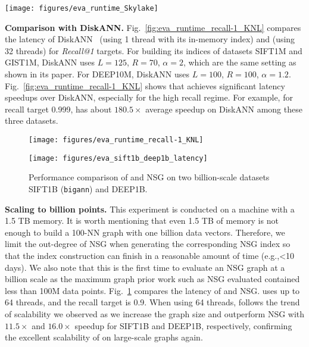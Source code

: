 \begin{figure*}
    \centering
    \texttt{[image: figures/eva\_runtime\_Skylake]}
    \caption[Study of Latency]{Latency comparison among HNSW, NSG, and \Hammer on  Skylake (16T).}
    \label{fig:eval-latency}
\end{figure*}

\textbf{Comparison with DiskANN.} Fig.~\ref{fig:eva_runtime_recall-1_KNL} compares the latency of DiskANN~\cite{subramanya32diskann} (using 1 thread with its in-memory index) and \Hammer (using 32 threads) for \emph{Recall@1} targets. 
For building its indices of datasets SIFT1M and GIST1M, DiskANN uses $L=125$, $R=70$, $\alpha = 2$, which are the same setting as shown in its paper. For DEEP10M, DiskANN uses $L=100$, $R=100$, $\alpha=1.2$. 
Fig.~\ref{fig:eva_runtime_recall-1_KNL} shows that \Hammer achieves significant latency speedups over DiskANN, especially for the high recall regime. For example, for recall target 0.999, \Hammer has about $180.5\times$ average speedup on DiskANN among these three datasets.

\begin{figure}[t]
\begin{minipage}[t]{0.55\textwidth}
    \centering
    \texttt{[image: figures/eva\_runtime\_recall-1\_KNL]}
    \caption[Recall@1 Latency]{Recall@1 latency of DiskANN and \Hammer.
    }
    \label{fig:eva_runtime_recall-1_KNL}
\end{minipage}
\hfill
\begin{minipage}[t]{0.42\textwidth}
    \centering
    \texttt{[image: figures/eva\_sift1b\_deep1b\_latency]}
    \caption[Latency for 1B datasets]{Performance comparison of \Hammer and NSG on two billion-scale datasets SIFT1B (\texttt{bigann}) and DEEP1B. 
        }
    \label{fig:eva_sift1b_deep1b_latency}
\end{minipage}
\end{figure}


\textbf{Scaling to billion points.}
This experiment is conducted on a machine with a 1.5 TB memory.
It is worth mentioning that even 1.5 TB of memory is not enough to build a 100-NN graph with one billion data vectors. Therefore, we limit the out-degree of NSG
when generating the corresponding NSG index so that the index construction can finish in a reasonable amount of time (e.g.,<10 days). We also note that this is the first time to evaluate an NSG graph at a billion scale as the maximum graph prior work such as NSG evaluated contained less than 100M data points. Fig.~\ref{fig:eva_sift1b_deep1b_latency} compares the latency of \Hammer and NSG. \Hammer uses up to 64 threads, and the recall target is 0.9. 
When using 64 threads, \Hammer follows the trend of scalability we observed as we increase the graph size and outperform NSG with $11.5\times$ and $16.0\times$ speedup for SIFT1B and DEEP1B, respectively, confirming the excellent scalability of \Hammer on large-scale graphs again. 






